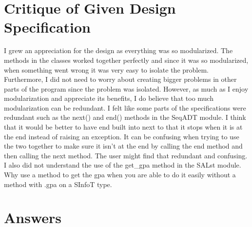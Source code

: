 \documentclass[12pt]{article}
\begin{document}
\section{Critique of Given Design Specification}

I grew an appreciation for the design as everything was so modularized. The methods in the classes worked together perfectly and since it was so modularized, when something went wrong it was very easy to isolate the problem. Furthermore, I did not need to worry about creating bigger problems in other parts of the program since the problem was isolated. However, as much as I enjoy modularization and appreciate its benefits, I do believe that too much modularization can be redundant. I felt like some parts of the specifications were redundant such as the next() and end() methods in the SeqADT module. I think that it would be better to have end built into next to that it stops when it is at the end instead of raising an exception. It can be confusing when trying to use the two together to make sure it isn’t at the end by calling the end method and then calling the next method. The user might find that redundant and confusing. I also did not understand the use of the get\_gpa method in the SALst module. Why use a method to get the gpa when you are able to do it easily without a method with .gpa on a SInfoT type.

\section{Answers}
\end{document}
